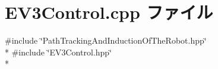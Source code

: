 \section{E\-V3\-Control.\-cpp ファイル}
\label{_e_v3_control_8cpp}
{\ttfamily \#include \char`\"{}Path\-Tracking\-And\-Induction\-Of\-The\-Robot.\-hpp\char`\"{}}\\*
{\ttfamily \#include \char`\"{}E\-V3\-Control.\-hpp\char`\"{}}\\*
